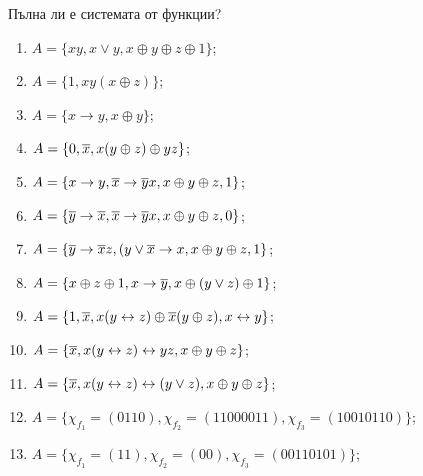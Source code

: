 \begin{problem} %
  Пълна ли е системата от функции?
  \begin{enumerate}[1)]
  \item
    $A = \{xy, x\vee y, x\oplus y\oplus z\oplus 1\}$;
  \item
    $A = \{1, xy(x\oplus z)\}$;
  \item
    $A = \{x\rightarrow y, x\oplus y\}$;
  \item
    $A = \{0, \overline{x}, x(y\oplus z)\oplus yz\}$;
  \item
    $A = \{x\rightarrow y, \overline{x}\rightarrow \overline{y}x, x\oplus y\oplus z, 1\}$;
  \item
    $A = \{\overline{y}\rightarrow\overline{x}, \overline{x}\rightarrow \overline{y}x, x\oplus y\oplus z, 0\}$;
  \item
    $A = \{\overline{y}\rightarrow \overline{x}z, (y\vee \overline{x} \rightarrow x, x\oplus y\oplus z, 1\}$;
  \item
    $A = \{x\oplus z \oplus 1, x \to \overline{y}, x\oplus (y \vee z) \oplus 1\}$;
  \item
    $A = \{1,\overline{x}, x(y\leftrightarrow z)\oplus\overline{x}(y\oplus z), x\leftrightarrow y\}$;
  \item
    $A = \{\overline{x}, x(y\leftrightarrow z) \leftrightarrow yz, x \oplus y \oplus z\}$;
  \item
    $A = \{\overline{x}, x(y\leftrightarrow z) \leftrightarrow (y\vee z), x \oplus y \oplus z\}$;
  \item
    $A = \{\chi_{f_1} = (0110), \chi_{f_2} = (1100 0011), \chi_{f_3} = (1001 0110)\}$;
  \item
    $A = \{\chi_{f_1} = (11), \chi_{f_2} = (00), \chi_{f_3} = (0011 0101)\}$;
  \end{enumerate}
\end{problem}
